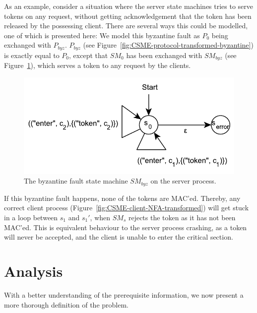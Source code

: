 \documentclass{article}
\begin{document}
		As an example, consider a situation where the server state machines tries to serve tokens on any request, without getting acknowledgement that the token has been released by the possessing client.
		There are several ways this could be modelled, one of which is presented here:
		We model this byzantine fault as $P_0$ being exchanged with $P_{byz}$.
		$P_{byz}$ (see Figure~\ref{fig:CSME-protocol-transformed-byzantine}) is exactly equal to $P_0$, except that $SM_0$ has been exchanged with $SM_{byz}$ (see Figure~\ref{fig:CSME-server-NFA-transformed-byzantine}), which serves a token to any request by the clients.

		\FloatBarrier
		\begin{figure}[ht!]
			\center
			\includegraphics[scale=0.6]{figures/state-machines/CSME-server-NFA-transformed-byzantine.pdf}
			\caption{The byzantine fault state machine $SM_{byz}$ on the server process.\label{fig:CSME-server-NFA-transformed-byzantine}}
		\end{figure}
		\FloatBarrier

		If this byzantine fault happens, none of the tokens are MAC'ed.
		Thereby, any correct client process (Figure~\ref{fig:CSME-client-NFA-transformed}) will get stuck in a loop between $s_1$ and $s_1'$, when $SM_s$ rejects the token as it has not been MAC'ed.
		This is equivalent behaviour to the server process crashing, as a token will never be accepted, and the client is unable to enter the critical section.

	\section{Analysis}
	\label{sec:analysis}

	With a better understanding of the prerequisite information, we now present a more thorough definition of the problem.
\end{document}
